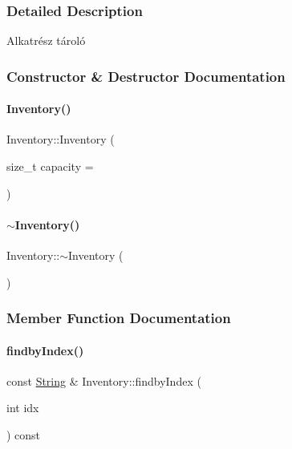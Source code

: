 \subsubsection{Detailed Description}
Alkatrész tároló 

\subsubsection{Constructor \& Destructor Documentation}
\mbox{\label{class_inventory_af2c8bea3c8fbf97fec4d3f5ffb92f347}} 
\paragraph{\texorpdfstring{Inventory()}{Inventory()}}
{\footnotesize\ttfamily Inventory\+::\+Inventory (\begin{DoxyParamCaption}\item[{size\+\_\+t}]{capacity = {} }\end{DoxyParamCaption})\hspace{0.3cm}{\ttfamily [inline]}}

\mbox{\label{class_inventory_a6c6dfcb6d977c74a7abf46809e892e3d}} 
\paragraph{\texorpdfstring{$\sim$Inventory()}{~Inventory()}}
{\footnotesize\ttfamily Inventory\+::$\sim$\+Inventory (\begin{DoxyParamCaption}{ }\end{DoxyParamCaption})\hspace{0.3cm}{\ttfamily [inline]}}



\subsubsection{Member Function Documentation}
\mbox{\label{class_inventory_acb0afe61bcfc92a963f803f1b70676dc}} 
\paragraph{\texorpdfstring{findbyIndex()}{findbyIndex()}}
{\footnotesize\ttfamily const \mbox{\hyperlink{class_string}{String}} \& Inventory\+::findby\+Index (\begin{DoxyParamCaption}\item[{int}]{idx }\end{DoxyParamCaption}) const}



